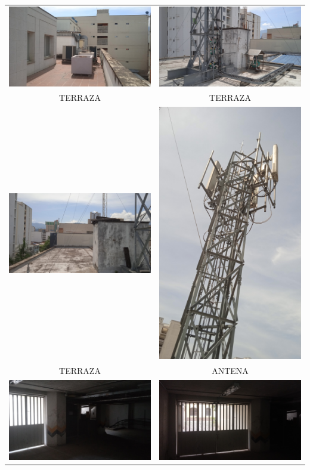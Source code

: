 \documentclass[12pt,a4paper,twoside]{article}
\begin{document}
\begin{tabular}{ c c }
	
	
\includegraphics[width = 7 cm]{Imagenes/35} & \includegraphics[width = 7 cm]{Imagenes/36} \\
	TERRAZA & TERRAZA\\
	\includegraphics[width = 7 cm]{Imagenes/37} & \includegraphics[width = 3 cm]{Imagenes/38} \\
	TERRAZA & ANTENA\\
		\includegraphics[width = 7 cm]{Imagenes/39} & \includegraphics[width = 7 cm]{Imagenes/40} \\

\end{tabular}
\end{document}
